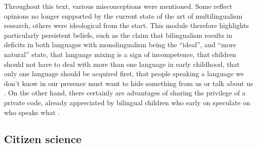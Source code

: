 \documentclass[output=paper,colorlinks,citecolor=brown]{langscibook}
\begin{document}
Throughout this text, various misconceptions were mentioned. Some reflect opinions no longer supported by the current state of the art of multilingualism research, others were ideological from the start. This module therefore highlights particularly persistent beliefs, such as the claim that bilingualism results in deficits in both languages with monolingualism being the “ideal”, and “more natural” state, that language mixing is a sign of incompetence, that children should not have to deal with more than one language in early childhood, that only one language should be acquired first, that people speaking a language we don’t know in our presence must want to hide something from us or talk about us \citep{Wiese&al.2020}. On the other hand, there certainly are advantages of sharing the privilege of a private code, already appreciated by bilingual children who early on speculate on who speaks what \citep{Tracy2008}.


\subsection{Citizen science}
\end{document}
